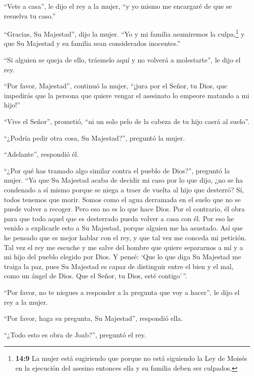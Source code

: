  ``Vete a casa'', le dijo el rey a la mujer, ``y yo mismo me
encargaré de que se resuelva tu caso.''

 ``Gracias, Su Majestad'', dijo la mujer. ``Yo y mi familia
asumiremos la culpa,\footnote{\textbf{14:9} La mujer está sugiriendo que
  porque no está siguiendo la Ley de Moisés en la ejecución del asesino
  entonces ella y su familia deben ser culpados.} y que Su Majestad y su
familia sean considerados inocentes.''

 ``Si alguien se queja de ello, tráemelo aquí y no volverá
a molestarte'', le dijo el rey.

 ``Por favor, Majestad'', continuó la mujer, ``¡jura por el
Señor, tu Dios, que impedirás que la persona que quiere vengar el
asesinato lo empeore matando a mi hijo!''

``Vive el Señor'', prometió, ``ni un solo pelo de la cabeza de tu hijo
caerá al suelo''.

 ``¿Podría pedir otra cosa, Su Majestad?'', preguntó la
mujer.

``Adelante'', respondió él.

 ``¿Por qué has tramado algo similar contra el pueblo de
Dios?'', preguntó la mujer. ``Ya que Su Majestad acaba de decidir mi
caso por lo que dijo, ¿no se ha condenado a sí mismo porque se niega a
traer de vuelta al hijo que desterró?  Sí, todos tenemos
que morir. Somos como el agua derramada en el suelo que no se puede
volver a recoger. Pero eso no es lo que hace Dios. Por el contrario, él
obra para que todo aquel que es desterrado pueda volver a casa con él.
 Por eso he venido a explicarle esto a Su Majestad, porque
alguien me ha asustado. Así que he pensado que es mejor hablar con el
rey, y que tal vez me conceda mi petición.  Tal vez el rey
me escuche y me salve del hombre que quiere separarnos a mí y a mi hijo
del pueblo elegido por Dios.  Y pensé: `Que lo que diga Su
Majestad me traiga la paz, pues Su Majestad es capaz de distinguir entre
el bien y el mal, como un ángel de Dios. Que el Señor, tu Dios, esté
contigo'\,''.

 ``Por favor, no te niegues a responder a la pregunta que
voy a hacer'', le dijo el rey a la mujer.

``Por favor, haga su pregunta, Su Majestad'', respondió ella.

 ``¿Todo esto es obra de Joab?'', preguntó el rey.

